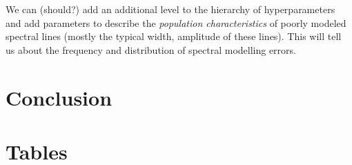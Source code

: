 \documentclass[iop,floatfix]{emulateapj}
\begin{document}
We can (should?) add an additional level to the hierarchy of
  hyperparameters and add parameters to describe the \emph{population
  characteristics} of poorly modeled spectral lines (mostly the typical width,
  amplitude of these lines).  This will tell us about the frequency and
distribution of spectral modelling errors.

\section{Conclusion}
\label{sec:conclusion}




\section{Tables}
\end{document}
